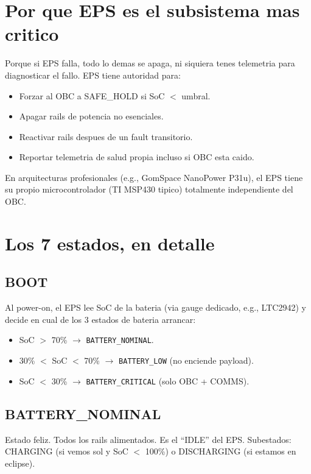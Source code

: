 \documentclass[11pt,a4paper,oneside,openright]{book}
\begin{document}
\section{Por que EPS es el subsistema mas critico}

Porque si EPS falla, todo lo demas se apaga, ni siquiera tenes
telemetria para diagnosticar el fallo. EPS tiene autoridad para:

\begin{itemize}[leftmargin=2em]
  \item Forzar al OBC a SAFE\_HOLD si SoC $< $ umbral.
  \item Apagar rails de potencia no esenciales.
  \item Reactivar rails despues de un fault transitorio.
  \item Reportar telemetria de salud propia incluso si OBC esta caido.
\end{itemize}

En arquitecturas profesionales (e.g., GomSpace NanoPower P31u), el
EPS tiene su propio microcontrolador (TI MSP430 tipico) totalmente
independiente del OBC.

\section{Los 7 estados, en detalle}

\subsection*{BOOT}

Al power-on, el EPS lee SoC de la bateria (via gauge dedicado, e.g.,
LTC2942) y decide en cual de los 3 estados de bateria arrancar:

\begin{itemize}[leftmargin=2em]
  \item SoC $>$ 70\% $\to$ \texttt{BATTERY\_NOMINAL}.
  \item 30\% $<$ SoC $<$ 70\% $\to$ \texttt{BATTERY\_LOW} (no enciende
    payload).
  \item SoC $<$ 30\% $\to$ \texttt{BATTERY\_CRITICAL} (solo OBC + COMMS).
\end{itemize}

\subsection*{BATTERY\_NOMINAL}

Estado feliz. Todos los rails alimentados. Es el ``IDLE'' del EPS.
Subestados: CHARGING (si vemos sol y SoC $<$ 100\%) o DISCHARGING (si
estamos en eclipse).
\end{document}
